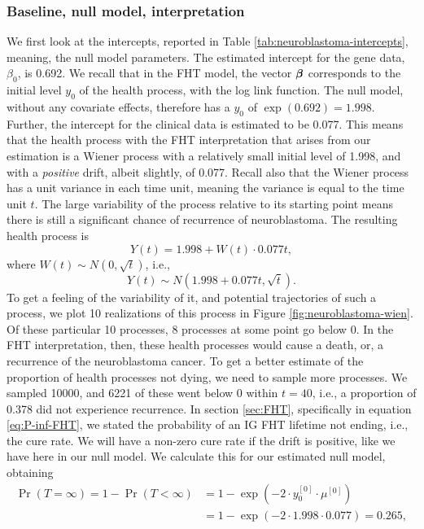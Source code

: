 \subsubsection{Baseline, null model, interpretation}
We first look at the intercepts, reported in Table \ref{tab:neuroblastoma-intercepts}, meaning, the null model parameters.
The estimated intercept for the gene data, $\beta_0$, is 0.692.
We recall that in the FHT model, the vector $\boldsymbol{\beta}$ corresponds to the initial level $y_0$ of the health process, with the log link function.
The null model, without any covariate effects, therefore has a $y_0$ of $\exp(0.692)=1.998$.
Further, the intercept for the clinical data is estimated to be 0.077.
This means that the health process with the FHT interpretation that arises from our estimation is a Wiener process with a relatively small initial level of 1.998, and with a \textit{positive} drift, albeit slightly, of 0.077.
Recall also that the Wiener process has a unit variance in each time unit, meaning the variance is equal to the time unit $t$.
The large variability of the process relative to its starting point means there is still a significant chance of recurrence of neuroblastoma.
The resulting health process is
\begin{equation*}
    Y(t)=1.998+W(t)\cdot0.077t,
\end{equation*}
where $W(t)\sim N(0,\sqrt{t})$,
i.e.,
\begin{equation*}
    Y(t)\sim N(1.998+0.077t,\sqrt{t}).
\end{equation*}
To get a feeling of the variability of it, and potential trajectories of such a process, we plot 10 realizations of this process in Figure \ref{fig:neuroblastoma-wien}.
Of these particular 10 processes, 8 processes at some point go below 0.
In the FHT interpretation, then, these health processes would cause a death, or, a recurrence of the neuroblastoma cancer.
To get a better estimate of the proportion of health processes not dying, we need to sample more processes.
We sampled 10000, and 6221 of these went below 0 within $t=40$, i.e., a proportion of 0.378 did not experience recurrence.
In section \ref{sec:FHT}, specifically in equation \eqref{eq:P-inf-FHT}, we stated the probability of an IG FHT lifetime not ending, i.e., the cure rate.
We will have a non-zero cure rate if the drift is positive, like we have here in our null model.
We calculate this for our estimated null model, obtaining
\begin{align*}
    \Pr{(T=\infty)}=1-\Pr{(T<\infty)}&=1-\exp{(-2\cdot y_0^{[0]}\cdot\mu^{[0]})}\\
    &=1-\exp{(-2\cdot 1.998\cdot 0.077)}=0.265,
\end{align*}
